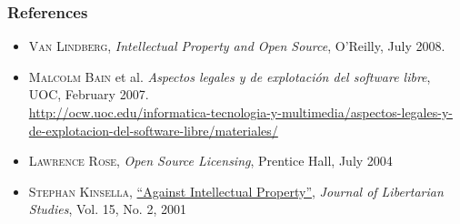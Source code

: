 \documentclass{beamer}
\begin{document}

\begin{frame}
\frametitle{References}

\begin{itemize}
\item \textsc{Van Lindberg}, \textit{Intellectual Property and Open Source}, O'Reilly, July 2008.
\item \textsc{Malcolm Bain} et al. \textit{Aspectos legales y de explotación del software libre}, UOC, February 2007. \\
{\footnotesize \url{http://ocw.uoc.edu/informatica-tecnologia-y-multimedia/aspectos-legales-y-de-explotacion-del-software-libre/materiales/}}
\item \textsc{Lawrence Rose}, \textit{Open Source Licensing}, Prentice Hall, July 2004 
\item \textsc{Stephan Kinsella}, \href{http://www.mises.org/journals/jls/15_2/15_2_1.pdf}{``Against Intellectual Property''}, \textit{Journal of Libertarian Studies}, Vol. 15, No. 2, 2001 
\end{itemize}

\end{frame}


\end{document}
